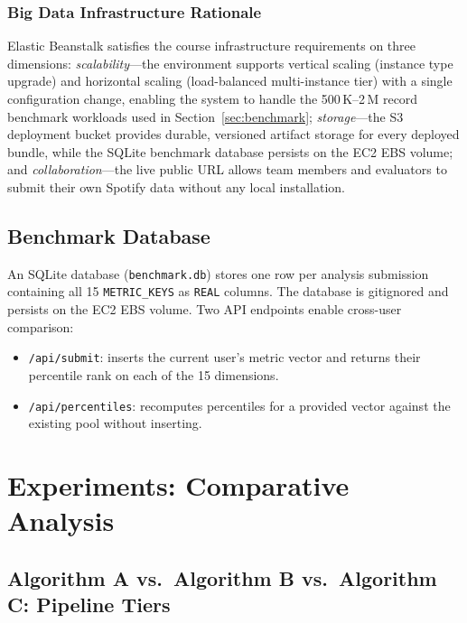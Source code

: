 \documentclass[conference]{IEEEtran}
\begin{document}
\subsubsection{Big Data Infrastructure Rationale}

Elastic Beanstalk satisfies the course infrastructure requirements on
three dimensions: \textit{scalability}—the environment supports
vertical scaling (instance type upgrade) and horizontal scaling
(load-balanced multi-instance tier) with a single configuration
change, enabling the system to handle the 500\,K–2\,M record benchmark
workloads used in Section~\ref{sec:benchmark}; \textit{storage}—the
S3 deployment bucket provides durable, versioned artifact storage for
every deployed bundle, while the SQLite benchmark database persists on
the EC2 EBS volume; and \textit{collaboration}—the live public URL
allows team members and evaluators to submit their own Spotify data
without any local installation.

\subsection{Benchmark Database}

An SQLite database (\texttt{benchmark.db}) stores one row per analysis
submission containing all 15 \texttt{METRIC\_KEYS} as \texttt{REAL} columns.
The database is gitignored and persists on the EC2 EBS volume. Two API
endpoints enable cross-user comparison:
\begin{itemize}
  \item \texttt{/api/submit}: inserts the current user's metric vector and
        returns their percentile rank on each of the 15 dimensions.
  \item \texttt{/api/percentiles}: recomputes percentiles for a provided
        vector against the existing pool without inserting.
\end{itemize}

\section{Experiments: Comparative Analysis}

\subsection{Algorithm A vs.\ Algorithm B vs.\ Algorithm C: Pipeline Tiers}
\end{document}
